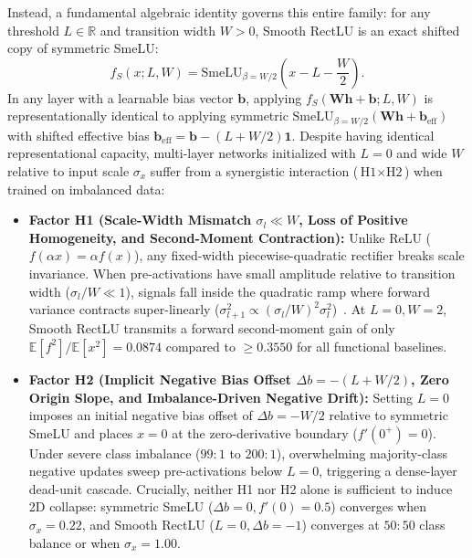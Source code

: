 \documentclass[10pt,a4paper]{article}
\begin{document}
Instead, a fundamental algebraic identity governs this entire family: for any threshold $L \in \mathbb{R}$ and transition width $W > 0$, Smooth RectLU is an exact shifted copy of symmetric SmeLU:
\begin{equation}
    f_S(x; L, W) = \text{SmeLU}_{\beta = W/2}\!\left(x - L - \frac{W}{2}\right).
    \label{eq:smelu_identity}
\end{equation}
In any layer with a learnable bias vector $\mathbf{b}$, applying $f_S(\mathbf{W}\mathbf{h} + \mathbf{b}; L, W)$ is representationally identical to applying symmetric $\text{SmeLU}_{\beta=W/2}(\mathbf{W}\mathbf{h} + \mathbf{b}_{\text{eff}})$ with shifted effective bias $\mathbf{b}_{\text{eff}} = \mathbf{b} - (L + W/2)\mathbf{1}$. Despite having identical representational capacity, multi-layer networks initialized with $L=0$ and wide $W$ relative to input scale $\sigma_x$ suffer from a synergistic interaction ($\text{H1} \times \text{H2}$) when trained on imbalanced data:
\begin{itemize}
    \item \textbf{Factor H1 (Scale-Width Mismatch $\sigma_l \ll W$, Loss of Positive Homogeneity, and Second-Moment Contraction):} Unlike ReLU ($f(\alpha x) = \alpha f(x)$), any fixed-width piecewise-quadratic rectifier breaks scale invariance. When pre-activations have small amplitude relative to transition width ($\sigma_l / W \ll 1$), signals fall inside the quadratic ramp where forward variance contracts super-linearly ($\sigma_{l+1}^2 \propto (\sigma_l / W)^2 \sigma_l^2$)~\cite{poole2016,schoenholz2017,hayou2019}. At $L=0, W=2$, Smooth RectLU transmits a forward second-moment gain of only $\mathbb{E}[f^2]/\mathbb{E}[x^2] = 0.0874$ compared to $\ge 0.3550$ for all functional baselines.
    \item \textbf{Factor H2 (Implicit Negative Bias Offset $\Delta b = -(L+W/2)$, Zero Origin Slope, and Imbalance-Driven Negative Drift):} Setting $L=0$ imposes an initial negative bias offset of $\Delta b = -W/2$ relative to symmetric SmeLU and places $x=0$ at the zero-derivative boundary ($f'(0^+) = 0$). Under severe class imbalance ($99:1$ to $200:1$), overwhelming majority-class negative updates sweep pre-activations below $L=0$, triggering a dense-layer dead-unit cascade. Crucially, neither H1 nor H2 alone is sufficient to induce 2D collapse: symmetric SmeLU ($\Delta b = 0, f'(0)=0.5$) converges when $\sigma_x = 0.22$, and Smooth RectLU ($L=0, \Delta b = -1$) converges at $50:50$ class balance or when $\sigma_x = 1.00$.
\end{itemize}
\end{document}
